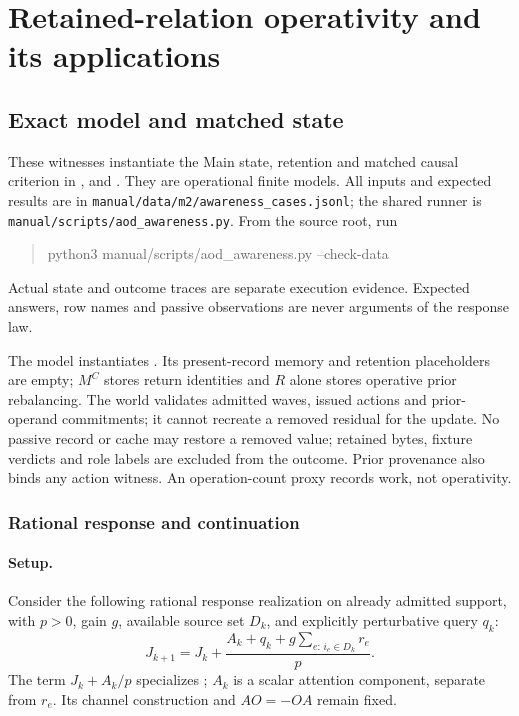 \section{Retained-relation operativity and its applications}
\label{manual:m2-awareness-fixtures}
\subsection{Exact model and matched state}
\label{sec:m2-awareness-ladder}
These witnesses instantiate the Main state, retention and matched causal
criterion in ,
 and
. They are operational finite models. All inputs and
expected results are in
\texttt{manual/data/m2/awareness\_cases.jsonl}; the shared runner is
\texttt{manual/scripts/aod\_awareness.py}. From the source root, run
\begin{quote}\small\ttfamily
python3 manual/scripts/aod\_awareness.py --check-data
\end{quote}
Actual state and outcome traces are separate execution evidence. Expected
answers, row names and passive observations are never arguments of the
response law.

The model instantiates .
Its present-record memory and retention placeholders are empty; \(M^C\) stores
return identities and \(R\) alone stores operative prior rebalancing.
The world validates admitted waves, issued actions and prior-operand commitments;
it cannot recreate a removed residual for the update. No passive record or
cache may restore a removed value; retained bytes, fixture verdicts and role
labels are excluded from the outcome. Prior provenance also binds any action
witness. An operation-count proxy records work, not operativity.

\subsubsection{Rational response and continuation}
\paragraph{Setup.}
Consider the following rational response realization on already admitted
support, with \(p>0\), gain \(g\), available source set \(D_k\), and explicitly
perturbative query \(q_k\):
\begin{equation}
 J_{k+1}=J_k+\frac{A_k+q_k+g\sum_{e:\,i_e\in D_k}r_e}{p}.
 \label{eq:awareness-response}
\end{equation}
The term \(J_k+A_k/p\) specializes ;
\(A_k\) is a scalar attention component, separate from \(r_e\).
Its channel construction and \(AO=-OA\) remain fixed.

